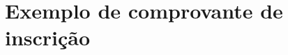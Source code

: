 \documentclass[
  10.5pt,				  %
	openright,			%
	twoside,			  %
  a5paper,
  chapter=TITLE,	%
	section=TITLE,	%
  hyphens,        %
	english,        %
	brazil          %
]{abntex2}
\begin{document}
\chapter{Exemplo de comprovante de inscrição}\label{anexo:comprovante}
\noindent
{}
\end{document}
